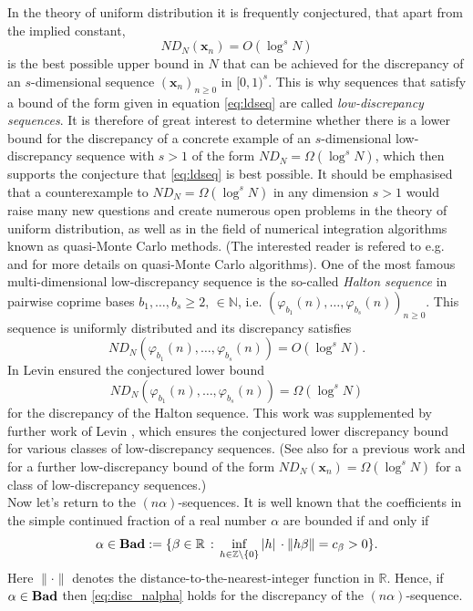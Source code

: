 \documentclass{article}
\newcommand{\bsx}{\boldsymbol{x}}%
\newcommand{\NN}{\mathbb N}
\newcommand{\ZZ}{\mathbb Z}
\newcommand{\RR}{\mathbb R}
\renewcommand{\(}{\left (}
\renewcommand{\)}{\right )}
\theoremstyle{definition}
\numberwithin{equation}{section}
\begin{document}
In the theory of uniform distribution it is frequently conjectured, that apart from the implied constant, \begin{equation}\label{eq:ldseq}
ND_N(\bsx_n)=O( \log^s N)
\end{equation} is the best possible upper bound in $N$ that can be achieved for the discrepancy of an $s$-dimensional sequence $(\bsx_n)_{n\geq 0}$ in $[0,1)^s$. This is why sequences that satisfy a bound of the form given in equation \eqref{eq:ldseq} are called \emph{low-discrepancy sequences}. It is therefore of great interest to determine whether there is a lower bound for the discrepancy of a concrete example of an $s$-dimensional low-discrepancy sequence with $s > 1$ of the form $ND_N=\Omega(\log^s N)$, which then supports the conjecture that \eqref{eq:ldseq} is best possible. 
It should be emphasised that a counterexample to $ND_N=\Omega(\log^s N)$ in any dimension $s>1$ would raise many new questions and create numerous open problems in the theory of uniform distribution, as well as in the field of numerical integration algorithms known as quasi-Monte Carlo methods. (The interested reader is refered to e.g. \cite{niesiam} and \cite{DP} for more details on quasi-Monte Carlo algorithms). 
One of the most famous multi-dimensional low-discrepancy sequence is the so-called \emph{Halton sequence} in pairwise coprime bases $b_1,\ldots,b_s\geq 2,\, \in\NN$, i.e. $(\varphi_{b_1}(n),\ldots,\varphi_{b_s}(n))_{n\geq 0}$. This sequence is {uniformly distributed} and its discrepancy satisfies $$ND_N(\varphi_{b_1}(n),\ldots,\varphi_{b_s}(n))=O(\log^s N).$$
In \cite{LevinH1} Levin ensured the conjectured lower bound $$ND_N(\varphi_{b_1}(n),\ldots,\varphi_{b_s}(n))=\Omega(\log^s N)$$ for the discrepancy of the Halton sequence. This work was supplemented by further work of Levin \cite{LevinH2,Levints1,Levints2}, which ensures the conjectured lower discrepancy bound for various classes of low-discrepancy sequences. (See also \cite{faureLB} for a previous work and \cite{HoferPAMS} for a further low-discrepancy bound of the form $ND_N(\bsx_n)=\Omega (\log^{s} N)$ for a class of low-discrepancy sequences.) \\


Now let's return to the $(n \alpha)$-sequences. It is well known that the coefficients in the simple continued fraction of a real number $\alpha$ are bounded if and only if $$\alpha\in {\bf{Bad}}:=\{\beta \in\RR\,:\, \inf_{h\in\ZZ\setminus\{0\}} |h|\,\cdot\|h\beta\|=c_{\beta}>0\}.$$
Here $\|\cdot\|$ denotes the distance-to-the-nearest-integer function in $\RR$. 
Hence, if $\alpha\in  {\bf{Bad}}$ then \eqref{eq:disc_nalpha} holds for the discrepancy of the $(n \alpha)$-sequence. %
\end{document}
